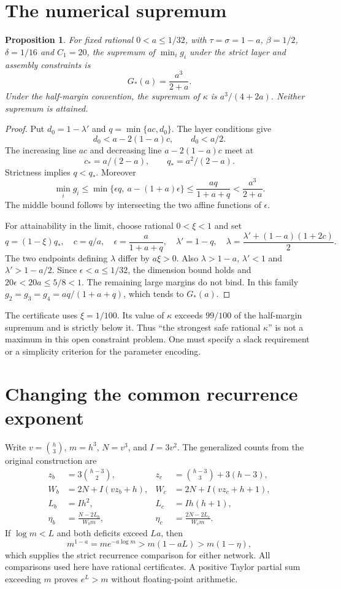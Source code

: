 \documentclass[11pt]{article}
\newtheorem{proposition}{Proposition}
\begin{document}
\section{The numerical supremum}
\begin{proposition}\label{prop:supremum}
For fixed rational $0<a\le1/32$, with $\tau=\sigma=1-a$,
$\beta=1/2$, $\delta=1/16$ and $C_1=20$, the supremum of
$\min_i g_i$ under the strict layer and assembly constraints is
\[
 G_*(a)=\frac{a^3}{2+a}.
\]
Under the half-margin convention, the supremum of $\kappa$ is
$a^3/(4+2a)$. Neither supremum is attained.
\end{proposition}
\begin{proof}
Put $d_0=1-\lambda'$ and $q=\min\{ac,d_0\}$. The layer conditions give
\[
 d_0< a-2(1-a)c,\qquad d_0<a/2.
\]
The increasing line $ac$ and decreasing line $a-2(1-a)c$ meet at
\[
 c_*=a/(2-a),\qquad q_*=a^2/(2-a).
\]
Strictness implies $q<q_*$. Moreover
\[
 \min_i g_i\le\min\{\epsilon q,\ a-(1+a)\epsilon\}
 \le\frac{a q}{1+a+q}<\frac{a^3}{2+a}.
\]
The middle bound follows by intersecting the two affine functions of
$\epsilon$.

For attainability in the limit, choose rational $0<\xi<1$ and set
\[
 q=(1-\xi)q_*,\quad c=q/a,\quad
 \epsilon=\frac{a}{1+a+q},\quad
 \lambda'=1-q,\quad
 \lambda=\frac{\lambda'+(1-a)(1+2c)}2.
\]
The two endpoints defining $\lambda$ differ by $a\xi>0$.
Also $\lambda>1-a$, $\lambda'<1$ and
$\lambda'>1-a/2$. Since $\epsilon<a\le1/32$, the dimension bound holds
and $20\epsilon<20a\le5/8<1$. The remaining large margins do not bind.
In this family $g_2=g_3=g_4=a q/(1+a+q)$, which tends to $G_*(a)$.
\end{proof}
The certificate uses $\xi=1/100$. Its value of $\kappa$ exceeds
$99/100$ of the half-margin supremum and is strictly below it. Thus
``the strongest safe rational $\kappa$'' is not a maximum in this open
constraint problem. One must specify a slack requirement or a simplicity
criterion for the parameter encoding.

\section{Changing the common recurrence exponent}
Write $v=\binom h3$, $m=h^3$, $N=v^3$, and $I=3v^2$.
The generalized counts from the original construction are
\begin{align*}
 z_b&=3\binom{h-3}{2},&z_c&=\binom{h-3}{3}+3(h-3),\\
 W_b&=2N+I(vz_b+h),&W_c&=2N+I(vz_c+h+1),\\
 L_b&=Ih^2,&L_c&=Ih(h+1),\\
 \eta_b&=\frac{N-2L_b}{W_bm},&
 \eta_c&=\frac{2N-2L_c}{W_cm}.
\end{align*}
If $\log m<L$ and both deficits exceed $La$, then
\[
 m^{1-a}=m e^{-a\log m}>m(1-aL)>m(1-\eta),
\]
which supplies the strict recurrence comparison for either network.
All comparisons used here have rational certificates. A positive Taylor
partial sum exceeding $m$ proves $e^L>m$ without floating-point arithmetic.
\end{document}
